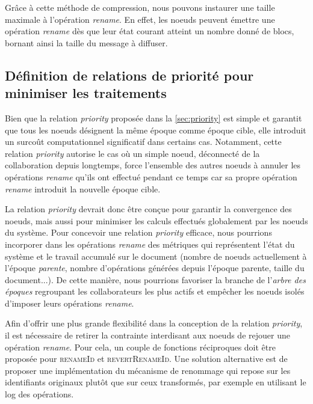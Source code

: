\documentclass[12pt]{thesul}
\begin{document}
Grâce à cette méthode de compression, nous pouvons instaurer une taille maximale à l'opération \emph{rename}.
En effet, les noeuds peuvent émettre une opération \emph{rename} dès que leur état courant atteint un nombre donné de blocs, bornant ainsi la taille du message à diffuser.

\subsection{Définition de relations de priorité pour minimiser les traitements}

Bien que la relation \emph{priority} proposée dans la \autoref{sec:priority} est simple et garantit que tous les noeuds désignent la même époque comme époque cible, elle introduit un surcoût computationnel significatif dans certains cas.
Notamment, cette relation \emph{priority} autorise le cas où un simple noeud, déconnecté de la collaboration depuis longtemps, force l'ensemble des autres noeuds à annuler les opérations \emph{rename} qu'ils ont effectué pendant ce temps car sa propre opération \emph{rename} introduit la nouvelle époque cible.

La relation \emph{priority} devrait donc être conçue pour garantir la convergence des noeuds, mais aussi pour minimiser les calculs effectués globalement par les noeuds du système.
Pour concevoir une relation \emph{priority} efficace, nous pourrions incorporer dans les opérations \emph{rename} des métriques qui représentent l'état du système et le travail accumulé sur le document (nombre de noeuds actuellement à l'époque \emph{parente}, nombre d'opérations générées depuis l'époque parente, taille du document...).
De cette manière, nous pourrions favoriser la branche de l'\emph{arbre des époques} regroupant les collaborateurs les plus actifs et empêcher les noeuds isolés d'imposer leurs opérations \emph{rename}.

Afin d'offrir une plus grande flexibilité dans la conception de la relation \emph{priority}, il est nécessaire de retirer la contrainte interdisant aux noeuds de rejouer une opération \emph{rename}.
Pour cela, un couple de fonctions réciproques doit être proposée pour \textsc{renameId} et \textsc{revertRenameId}.
Une solution alternative est de proposer une implémentation du mécanisme de renommage qui repose sur les identifiants originaux plutôt que sur ceux transformés, par exemple en utilisant le log des opérations.
\end{document}

